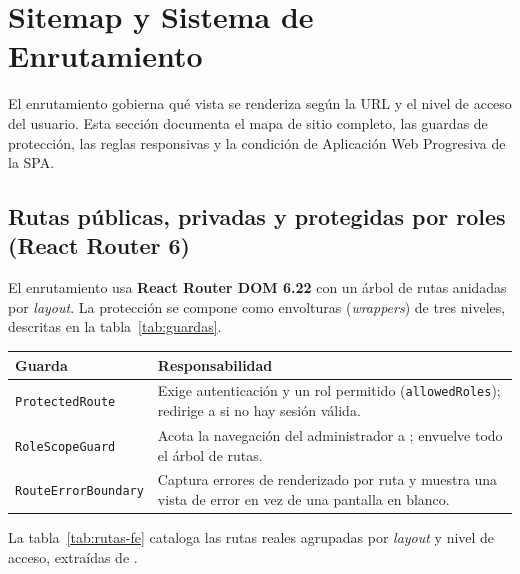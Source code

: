 \section{Sitemap y Sistema de Enrutamiento}
\label{sec:sitemap}

El enrutamiento gobierna qué vista se renderiza según la URL y el nivel de acceso del
usuario. Esta sección documenta el mapa de sitio completo, las guardas de protección, las
reglas responsivas y la condición de Aplicación Web Progresiva de la SPA.

\subsection{Rutas públicas, privadas y protegidas por roles (React Router 6)}
\label{subsec:rutas}

El enrutamiento usa \textbf{React Router DOM 6.22} con un árbol de rutas anidadas por
\textit{layout}. La protección se compone como envolturas (\textit{wrappers}) de tres
niveles, descritas en la tabla~\ref{tab:guardas}.

\vspace{0.2cm}
\noindent
\renewcommand{\arraystretch}{1.3}
\fontsize{8.5}{10.2}\selectfont\sffamily
\begin{tabularx}{\textwidth}{|L{3.6cm}|Y|}
\hline
{}
\sffamily\textbf{Guarda} & \sffamily\textbf{Responsabilidad} \\
\hline
\texttt{ProtectedRoute} & Exige autenticación y un rol permitido (\texttt{allowedRoles}); redirige a  si no hay sesión válida. \\ \hline
{}
\texttt{RoleScopeGuard} & Acota la navegación del administrador a ; envuelve todo el árbol de rutas. \\ \hline
\texttt{RouteErrorBoundary} & Captura errores de renderizado por ruta y muestra una vista de error en vez de una pantalla en blanco. \\ \hline
\end{tabularx}
\label{tab:guardas}

La tabla~\ref{tab:rutas-fe} cataloga las rutas reales agrupadas por \textit{layout} y
nivel de acceso, extraídas de .

